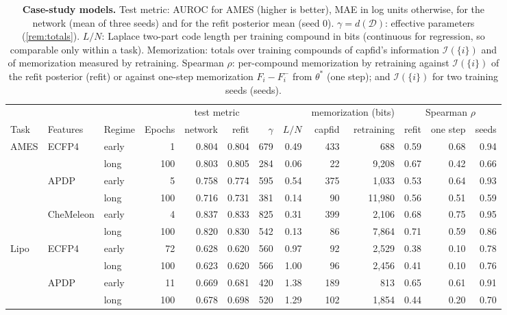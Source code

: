\documentclass[10pt,twocolumn,letterpaper]{article}
\theoremstyle{definition}
\newcommand{\Inf}{\mathcal{I}}
\newcommand{\D}{\mathcal{D}}
\newcommand{\dof}{d}
\begin{document}
\begin{table}[t]
\centering\small
\setlength{\tabcolsep}{4.2pt}
\caption{\textbf{Case-study models.} Test metric: AUROC for AMES (higher is better), MAE in log units otherwise, for the network (mean of three seeds) and for the refit posterior mean (seed 0). $\gamma=\dof(\D)$: effective parameters (\cref{rem:totals}). $L/N$: Laplace two-part code length per training compound in bits (continuous for regression, so comparable only within a task). Memorization: totals over training compounds of capfid's information $\Inf(\{i\})$ and of memorization measured by retraining. Spearman $\rho$: per-compound memorization by retraining against $\Inf(\{i\})$ of the refit posterior (refit) or against one-step memorization $F_i-F_i^{-}$ from $\theta^*$ (one step); and $\Inf(\{i\})$ for two training seeds (seeds).}\label{tab:tdc}
\begin{tabular}{@{}lllrrrrrrrrrr@{}}
\toprule
 & & & & \multicolumn{2}{c}{test metric} & & & \multicolumn{2}{c}{memorization (bits)} & \multicolumn{3}{c}{Spearman $\rho$}\\
\cmidrule(lr){5-6}\cmidrule(lr){9-10}\cmidrule(l){11-13}
Task & Features & Regime & Epochs & network & refit & $\gamma$ & $L/N$ & capfid & retraining & refit & one step & seeds\\
\midrule
AMES & ECFP4 & early & 1 & 0.804 & 0.804 & 679 & 0.49 & 433 & 688 & 0.59 & 0.68 & 0.94 \\
 &  & long & 100 & 0.803 & 0.805 & 284 & 0.06 & 22 & 9{,}208 & 0.67 & 0.42 & 0.66 \\
 & APDP & early & 5 & 0.758 & 0.774 & 595 & 0.54 & 375 & 1{,}033 & 0.53 & 0.64 & 0.93 \\
 &  & long & 100 & 0.716 & 0.731 & 381 & 0.14 & 90 & 11{,}980 & 0.56 & 0.51 & 0.59 \\
 & CheMeleon & early & 4 & 0.837 & 0.833 & 825 & 0.31 & 399 & 2{,}106 & 0.68 & 0.75 & 0.95 \\
 &  & long & 100 & 0.820 & 0.830 & 542 & 0.13 & 86 & 7{,}864 & 0.71 & 0.59 & 0.86 \\
\addlinespace
Lipo & ECFP4 & early & 72 & 0.628 & 0.620 & 560 & 0.97 & 92 & 2{,}529 & 0.38 & 0.10 & 0.78 \\
 &  & long & 100 & 0.623 & 0.620 & 566 & 1.00 & 96 & 2{,}456 & 0.41 & 0.10 & 0.76 \\
 & APDP & early & 11 & 0.669 & 0.681 & 420 & 1.38 & 189 & 813 & 0.65 & 0.61 & 0.91 \\
 &  & long & 100 & 0.678 & 0.698 & 520 & 1.29 & 102 & 1{,}854 & 0.44 & 0.20 & 0.70 \\

\end{tabular}
\end{table}
\end{document}
